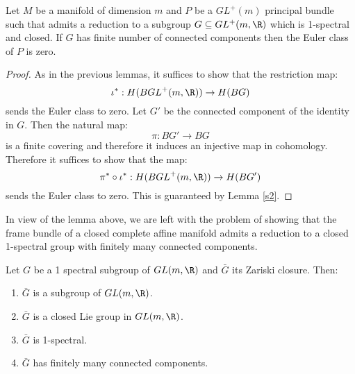\begin{lemma}\label{lemmaspectral}
	Let $M$ be a manifold of dimension $m$ and $P$ be a $GL^{+}(m)$ principal bundle such that admits a reduction to  a subgroup $G \subseteq GL^{+}(m,\R)$ which is 1-spectral and closed. If $G$ has finite number of  connected components  then the Euler class of $P$ is zero.
\end{lemma}
\begin{proof}
	As in the previous lemmas, it suffices to show that the restriction map:
	\[ \iota^*: H(B{GL}^+(m,\R)) \rightarrow H(BG)\]
	sends the Euler class to zero. Let $G'$ be the connected component of the identity in $G$. Then the natural map:
	\[ \pi: BG' \rightarrow BG\]
	is a finite covering and therefore it induces an injective map in cohomology. Therefore it suffices to show that the map:
	\[ \pi^* \circ \iota^*: H(B{GL}^+(m,\R)) \rightarrow H(BG')\]
	sends the Euler class to zero. This is guaranteed by Lemma \ref{s2}.
	
\end{proof}

In view of the lemma above, we are left with the problem of showing that the frame bundle of a closed complete affine manifold admits a reduction to a closed 1-spectral group with finitely many connected components.

\begin{lemma}\label{z}
	Let $G$ be a 1 spectral subgroup of $GL(m,\R)$ and $\bar{G}$ its Zariski closure.
	Then:
	\begin{enumerate}
		\item  $\bar{G}$ is a subgroup of $GL(m,\R)$.
		\item $\bar{G}$ is a closed Lie group in $GL(m,\R)$.
		\item $\bar{G}$ is 1-spectral.
		\item $\bar{G}$ has finitely many connected components.
	\end{enumerate}
\end{lemma}

